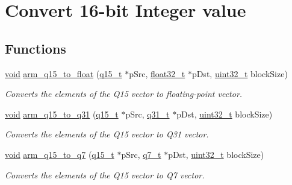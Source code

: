 \hypertarget{group__q15__to__x}{\section{Convert 16-\/bit Integer value}
\label{group__q15__to__x}
}
\subsection*{Functions}
\begin{DoxyCompactItemize}
\item 
\hyperlink{group___n_a_m_e_ga18028b8badbf1ea7e704ccac3c488e82}{void} \hyperlink{group__q15__to__x_gaf8b0d2324de273fc430b0e61ad4e9eb2}{arm\-\_\-q15\-\_\-to\-\_\-float} (\hyperlink{arm__math_8h_ab5a8fb21a5b3b983d5f54f31614052ea}{q15\-\_\-t} $\ast$p\-Src, \hyperlink{arm__math_8h_a4611b605e45ab401f02cab15c5e38715}{float32\-\_\-t} $\ast$p\-Dst, \hyperlink{stdint_8h_a435d1572bf3f880d55459d9805097f62}{uint32\-\_\-t} block\-Size)
\begin{DoxyCompactList}\small\item\em Converts the elements of the Q15 vector to floating-\/point vector. \end{DoxyCompactList}\item 
\hyperlink{group___n_a_m_e_ga18028b8badbf1ea7e704ccac3c488e82}{void} \hyperlink{group__q15__to__x_ga7ba2d87366990ad5380439e2b4a4c0a5}{arm\-\_\-q15\-\_\-to\-\_\-q31} (\hyperlink{arm__math_8h_ab5a8fb21a5b3b983d5f54f31614052ea}{q15\-\_\-t} $\ast$p\-Src, \hyperlink{arm__math_8h_adc89a3547f5324b7b3b95adec3806bc0}{q31\-\_\-t} $\ast$p\-Dst, \hyperlink{stdint_8h_a435d1572bf3f880d55459d9805097f62}{uint32\-\_\-t} block\-Size)
\begin{DoxyCompactList}\small\item\em Converts the elements of the Q15 vector to Q31 vector. \end{DoxyCompactList}\item 
\hyperlink{group___n_a_m_e_ga18028b8badbf1ea7e704ccac3c488e82}{void} \hyperlink{group__q15__to__x_ga8fb31855ff8cce09c2ec9308f48ded69}{arm\-\_\-q15\-\_\-to\-\_\-q7} (\hyperlink{arm__math_8h_ab5a8fb21a5b3b983d5f54f31614052ea}{q15\-\_\-t} $\ast$p\-Src, \hyperlink{arm__math_8h_ae541b6f232c305361e9b416fc9eed263}{q7\-\_\-t} $\ast$p\-Dst, \hyperlink{stdint_8h_a435d1572bf3f880d55459d9805097f62}{uint32\-\_\-t} block\-Size)
\begin{DoxyCompactList}\small\item\em Converts the elements of the Q15 vector to Q7 vector. \end{DoxyCompactList}\end{DoxyCompactItemize}


